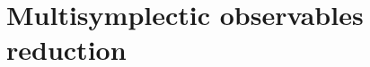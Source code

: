 \documentclass[handout,10pt]{beamer}
\begin{document}
\section{Multisymplectic observables reduction}
\checkpoint	







\appendix

%	
	











\end{document}

